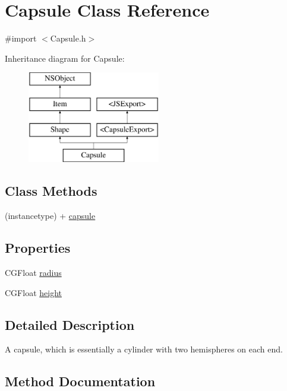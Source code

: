 \hypertarget{interface_capsule}{}\section{Capsule Class Reference}
\label{interface_capsule}


{\ttfamily \#import $<$Capsule.\+h$>$}

Inheritance diagram for Capsule\+:\begin{figure}[H]
\begin{center}
\leavevmode
\includegraphics[height=4.000000cm]{interface_capsule}
\end{center}
\end{figure}
\subsection*{Class Methods}
\begin{DoxyCompactItemize}
\item 
(instancetype) + \hyperlink{interface_capsule_aee278b398dadc52206d87d077437c60d}{capsule}
\end{DoxyCompactItemize}
\subsection*{Properties}
\begin{DoxyCompactItemize}
\item 
C\+G\+Float \hyperlink{interface_capsule_a00cf715e211d33ccb571d19494532408}{radius}
\item 
C\+G\+Float \hyperlink{interface_capsule_ac3923995c04f49498a358b6bda806210}{height}
\end{DoxyCompactItemize}


\subsection{Detailed Description}
A capsule, which is essentially a cylinder with two hemispheres on each end. 

\subsection{Method Documentation}
\hypertarget{interface_capsule_aee278b398dadc52206d87d077437c60d}{}
